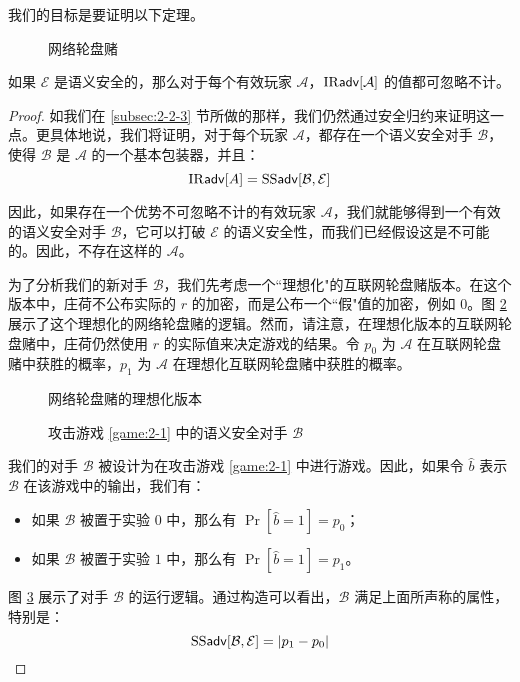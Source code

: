 我们的目标是要证明以下定理。

\begin{figure}
	\centering
	
	\caption{网络轮盘赌}
	\label{fig:2-2}
\end{figure}

\begin{theorem}
如果 $\mathcal{E}$ 是语义安全的，那么对于每个有效玩家 $\mathcal{A}$，${\rm IR\mathsf{adv}}[\mathcal{A}]$ 的值都可忽略不计。
\end{theorem}

\begin{proof}
如我们在 \ref{subsec:2-2-3} 节所做的那样，我们仍然通过安全归约来证明这一点。更具体地说，我们将证明，对于每个玩家 $\mathcal{A}$，都存在一个语义安全对手 $\mathcal{B}$，使得 $\mathcal{B}$ 是 $\mathcal{A}$ 的一个基本包装器，并且：
\begin{equation}\label{eq:2-7}
{\rm IR\mathsf{adv}}[A]={\rm SS\mathsf{adv}}[\mathcal{B},\mathcal{E}]
\end{equation}

因此，如果存在一个优势不可忽略不计的有效玩家 $\mathcal{A}$，我们就能够得到一个有效的语义安全对手 $\mathcal{B}$，它可以打破 $\mathcal{E}$ 的语义安全性，而我们已经假设这是不可能的。因此，不存在这样的 $\mathcal{A}$。

为了分析我们的新对手 $\mathcal{B}$，我们先考虑一个``理想化"的互联网轮盘赌版本。在这个版本中，庄荷不公布实际的 $r$ 的加密，而是公布一个``假"值的加密，例如 $0$。图 \ref{fig:2-3} 展示了这个理想化的网络轮盘赌的逻辑。然而，请注意，在理想化版本的互联网轮盘赌中，庄荷仍然使用 $r$ 的实际值来决定游戏的结果。令 $p_0$ 为 $\mathcal{A}$ 在互联网轮盘赌中获胜的概率，$p_1$ 为 $\mathcal{A}$ 在理想化互联网轮盘赌中获胜的概率。

\begin{figure}
	\centering
	
	\caption{网络轮盘赌的理想化版本}
	\label{fig:2-3}
\end{figure}

\begin{figure}
	\centering
	
	\caption{攻击游戏 \ref{game:2-1} 中的语义安全对手 $\mathcal{B}$}
	\label{fig:2-4}
\end{figure}

我们的对手 $\mathcal{B}$ 被设计为在攻击游戏 \ref{game:2-1} 中进行游戏。因此，如果令 $\hat b$ 表示 $\mathcal{B}$ 在该游戏中的输出，我们有：
\begin{itemize}
	\item 如果 $\mathcal{B}$ 被置于实验 $0$ 中，那么有 $\Pr[\hat b=1]=p_0$；
	\item 如果 $\mathcal{B}$ 被置于实验 $1$ 中，那么有 $\Pr[\hat b=1]=p_1$。
\end{itemize}
图 \ref{fig:2-4} 展示了对手 $\mathcal{B}$ 的运行逻辑。通过构造可以看出，$\mathcal{B}$ 满足上面所声称的属性，特别是：
\begin{equation}\label{eq:2-8}
{\rm SS\mathsf{adv}}[\mathcal{B},\mathcal{E}]=|p_1-p_0|
\end{equation}


\end{proof}
